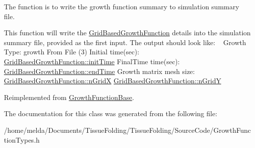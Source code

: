 The function is to write the growth function summary to simulation summary file. 

This function will write the \hyperlink{classGridBasedGrowthFunction}{Grid\+Based\+Growth\+Function} details into the simulation summary file, provided as the first input. The output should look like\+: ~\newline
 Growth Type\+: growth From File (3) Initial time(sec)\+: \hyperlink{classGrowthFunctionBase_ae92513a7b41637df8e26e7db35ddf97c}{Grid\+Based\+Growth\+Function\+::init\+Time} Final\+Time time(sec)\+: \hyperlink{classGrowthFunctionBase_a3ff4db0573d354a75666a5f3ca446941}{Grid\+Based\+Growth\+Function\+::end\+Time} Growth matrix mesh size\+: \hyperlink{classGridBasedGrowthFunction_af872b9963f3a579dcd615c23bcb58a86}{Grid\+Based\+Growth\+Function\+::n\+Grid\+X} \hyperlink{classGridBasedGrowthFunction_a625bc963a1f1e7d1f1a35dbd0ef51728}{Grid\+Based\+Growth\+Function\+::n\+Grid\+Y}

Reimplemented from \hyperlink{classGrowthFunctionBase}{Growth\+Function\+Base}.



The documentation for this class was generated from the following file\+:\begin{DoxyCompactItemize}
\item 
/home/melda/\+Documents/\+Tissue\+Folding/\+Tissue\+Folding/\+Source\+Code/Growth\+Function\+Types.\+h\end{DoxyCompactItemize}
